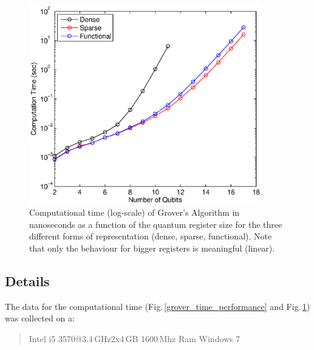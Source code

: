 \documentclass[bibliography=totocnumbered, 10pt]{article}
\theoremstyle{NoticeStyle}
\begin{document}
\begin{figure}[H]
	\centering
	\includegraphics[width=0.9\textwidth]{img/Grover_Time_Performance_log.eps}
	\caption{Computational time (log-scale) of Grover's Algorithm in nanoseconds as a function of the quantum register size for the three different forms of representation (dense, sparse, functional). Note that only the behaviour for bigger registers is meaningful (linear).}
	\label{grover_time_performance_log}
\end{figure}

\subsection{Details}
The data for the computational time (Fig.\,\ref{grover_time_performance} and Fig.\,\ref{grover_time_performance_log}) was collected on a:

\begin{quotation}
	Intel i5 3570@3.4\,GHz\quad\quad 2x4\,GB 1600\,Mhz Ram \quad\quad Windows 7
\end{quotation}

	


%

\newpage

{}

\nocite{Perry2012}
\nocite{BasicConceptsQC}

\label{sec:References}


\end{document}
